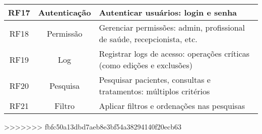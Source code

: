 \begin{quadro}
\begin{tabular}{|c|c|p{10cm}|}
        RF17   & Autenticação & Autenticar usuários: login e senha \\ \hline
        RF18   & Permissão    & Gerenciar permissões: admin, profissional de saúde, recepcionista, etc. \\ \hline
        RF19   & Log          & Registrar logs de acesso: operações críticas (como edições e exclusões) \\ \hline
        RF20   & Pesquisa     & Pesquisar pacientes, consultas e tratamentos: múltiplos critérios \\ \hline
        RF21   & Filtro       & Aplicar filtros e ordenações nas pesquisas \\ \hline
    \end{tabular}
\end{quadro}
>>>>>>> fbfc50a13dbd7aeb8e3bf54a38294140f20ecb63
